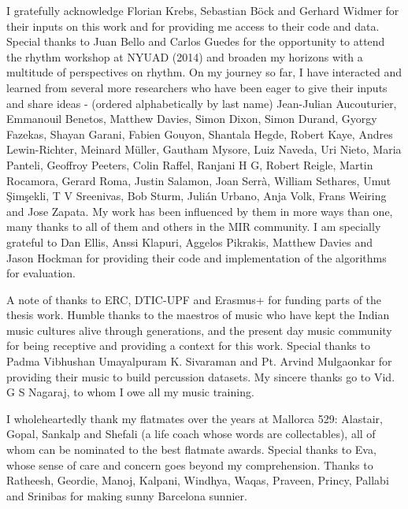 I gratefully acknowledge Florian Krebs, Sebastian Böck and Gerhard Widmer for their inputs on this work and for providing me access to their code and data. Special thanks to Juan Bello and Carlos Guedes for the opportunity to attend the rhythm workshop at NYUAD (2014) and broaden my horizons with a multitude of perspectives on rhythm. On my journey so far, I have interacted and learned from several more researchers who have been eager to give their inputs and share ideas - (ordered alphabetically by last name) Jean-Julian Aucouturier, Emmanouil Benetos, Matthew Davies, Simon Dixon, Simon Durand, Gyorgy Fazekas, Shayan Garani, Fabien Gouyon, Shantala Hegde, Robert Kaye, Andres Lewin-Richter, Meinard Müller, Gautham Mysore, Luiz Naveda, Uri Nieto, Maria Panteli, Geoffroy Peeters, Colin Raffel, Ranjani H G, Robert Reigle, Martin Rocamora, Gerard Roma, Justin Salamon, Joan Serrà, William Sethares, Umut Şimşekli, T V Sreenivas, Bob Sturm, Julián Urbano, Anja Volk, Frans Weiring and Jose Zapata. My work has been influenced by them in more ways than one, many thanks to all of them and others in the MIR community. I am specially grateful to Dan Ellis, Anssi Klapuri, Aggelos Pikrakis, Matthew Davies and Jason Hockman for providing their code and implementation of the algorithms for evaluation. 

A note of thanks to ERC, DTIC-UPF and Erasmus+ for funding parts of the thesis work. Humble thanks to the maestros of music who have kept the Indian music cultures alive through generations, and the present day music community for being receptive and providing a context for this work. Special thanks to Padma Vibhushan Umayalpuram K. Sivaraman and Pt. Arvind Mulgaonkar for providing their music to build percussion datasets. My sincere thanks go to Vid. G S Nagaraj, to whom I owe all my music training. 

I wholeheartedly thank my flatmates over the years at Mallorca 529: Alastair, Gopal, Sankalp and Shefali (a life coach whose words are collectables), all of whom can be nominated to the best flatmate awards. Special thanks to Eva, whose sense of care and concern goes beyond my comprehension. Thanks to Ratheesh, Geordie, Manoj, Kalpani, Windhya, Waqas, Praveen, Princy, Pallabi and Srinibas for making sunny Barcelona sunnier. 

